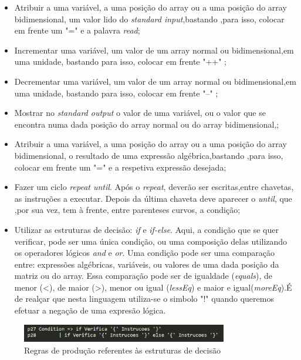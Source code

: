 \documentclass[11pt,a4paper]{report}
\begin{document}
 \begin{itemize}
 	\item Atribuir a uma variável, a uma posição do array ou a uma posição do array bidimensional, um valor lido do \textit{standard input},bastando ,para isso, colocar em frente um "=" e a palavra \textit{read};
    \item Incrementar uma variável, um valor de um array normal ou bidimensional,em uma unidade, bastando para isso, colocar em frente "++" ;
 	\item Decrementar uma variável, um valor de um array normal ou bidimensional,em uma unidade, bastando para isso, colocar em frente "--" ;
 	\item Mostrar no \textit{standard output} o valor de uma variável, ou o valor que se encontra numa dada posição do array normal ou do array bidimensional,;
 	\item Atribuir a uma variável, a uma posição do array ou a uma posição do array bidimensional, o resultado de uma expressão algébrica,bastando ,para isso, colocar em frente um "=" e a respetiva expressão desejada;
 	\item Fazer um ciclo \textit{repeat until}. Após o \textit{repeat}, deverão ser escritas,entre chavetas, as instruções a executar. Depois da última chaveta deve aparecer o \textit{until}, que ,por sua vez, tem à frente, entre parenteses curvos, a condição;
 	\item Utilizar as estruturas de decisão: \textit{if} e \textit{if-else}. Aqui, a condição que se quer verificar, pode ser uma única condição, ou uma composição delas utilizando os operadores lógicos \textit{and} e \textit{or}. Uma condição pode ser uma comparação entre: expressões algébricas, variáveis, ou valores de uma dada posição da matriz ou do array. Essa comparação pode ser de igualdade (\textit{equals}), de menor (<), de maior (>), menor ou igual (\textit{lessEq}) e maior e igual(\textit{moreEq}).É de realçar que nesta linguagem utiliza-se o simbolo "!" quando queremos efetuar a negação de uma expresão lógica.
 	
\end{itemize}
\vspace{2ex}


\begin{figure}[hbt!]
	\centering
	\includegraphics[width=90mm,scale = 2]{images/ifs}
	\caption{Regras de produção referentes às estruturas de decisão}
	\label{fig:instruções}
\end{figure}
\end{document}

